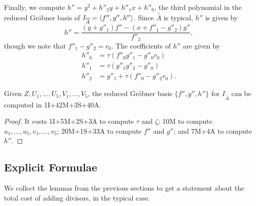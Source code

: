 \begin{comment}
\begin{align*}
  G_3 &= u_5 \\
  f''_2 &= u_5(u_5 - c_8) + u_4 - v_5 \\
  G_2 &= v_4 + v_5(u_5 - c_8) + \tau(u_5(u_5(u_3 - c_6) + v_5(u_4 - c_7) + c_5 - v_3) + v_5(u_3 - v_4) - u_2) \\
  e_3 &= f''_2v_5 - G_2u_5 \\
  f''_1 &= u_5(u_4 - c_7) + G_2 + u_3 - v_4 \\
  G_1 &= u_5(c_6 - u_3) - e_3 + v_3 \\
  f''_0 &= c_7e_3 + u_5(u_2 - c_4) + G_2u_3 + G_1u_4 - f''_2v_3 - f''_1v_4 + u_1 - v_2 \\
  G_0 &= -c_6e_3 + u_5(c_3 - u_1) - G_1u_3 + f''_1v_3 + v_1.
\end{align*}
\end{comment}

Finally, we compute $h'' = y^2 + h''_2y + h''_1x + h''_0$,
the third polynomial in the reduced Gr\"obner basis of $I_{\overline{\overline A}} = \left\langle f'', g'', h'' \right\rangle$.
Since $\bar{\bar A}$ is typical, $h''$ is given by
\[ h'' = \frac {(y + g''_1)f'' - (x + f''_1 - g''_2)g''} {f''_2}, \]
though we note that $f''_1 - g''_2 = r_0$.
The coefficients of $h''$ are given by
\begin{align*}
  h''_0 &= \tau(f''_0g''_1 - g''_0r_0) \\
  h''_1 &= \tau(g''_1g''_2 - g''_0) \\
  h''_2 &= g''_1 + \tau(f''_0 - g''_2r_0).
\end{align*}

\begin{lemma}
  \label{lem_fgh_op_count}
  Given $Z, U_1, \ldots, U_5, V_1, \ldots, V_5$,
  the reduced Gr\"obner basis $\{f'',g'',h''\}$ for $I_{\bar{\bar A}}$ can be computed in 1I+42M+3S+40A.
\end{lemma}
\begin{proof}
  It costs 1I+5M+2S+3A to compute $\tau$ and $\zeta$;
  10M to compute $u_1, \ldots, u_5, v_1, \ldots, v_5$;
  20M+1S+33A to compute $f''$ and $g''$; and
  7M+4A to compute $h''$.
\end{proof}



\subsection{Explicit Formulae}

We collect the lemmas from the previous sections
to get a statement about the total cost of adding divisors,
in the typical case.

